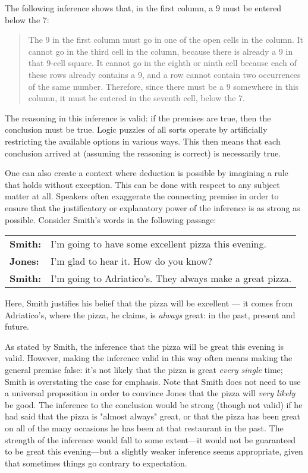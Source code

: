 The following inference shows that, in the first column, a 9 must be entered below the 7:

\begin{quotation} The 9 in the first column must go in one of the open cells in the column. It cannot go in the third cell in the column, because there is already a 9 in that 9-cell square. It cannot go in the eighth or ninth cell because each of these rows already contains a 9, and a row cannot contain two occurrences of the same number. Therefore, since there must be a 9 somewhere in this column, it must be entered in the seventh cell, below the 7.\end{quotation}

The reasoning in this inference is valid: if the premises are true, then the conclusion must be true. Logic puzzles of all sorts operate by artificially restricting the available options in various ways. This then means that each conclusion arrived at (assuming the reasoning is correct) is necessarily true.

One can also create a context where deduction is possible by imagining a rule that holds without exception. This can be done with respect to any subject matter at all. Speakers often exaggerate the connecting premise in order to ensure that the justificatory or explanatory power of the inference is as strong as possible. Consider Smith's words in the following passage:


\begin{adjustwidth}{2em}{0em}
\begin{longtabu}{p{.1\linewidth}p{.8\linewidth}}
\textbf{Smith:} & I'm going to have some excellent pizza this evening. \\
\textbf{Jones:} & I'm glad to hear it. How do you know?\\
\textbf{Smith:} & I'm going to Adriatico's. They always make a great pizza. \\
\end{longtabu}
\end{adjustwidth}
\vspace{-1cm}

Here, Smith justifies his belief that the pizza will be excellent --- it comes from Adriatico's, where the pizza, he claims, is \textit{always }great: in the past, present and future.

As stated by Smith, the inference that the pizza will be great this evening is valid. However, making the inference valid in this way often means making the general premise false: it's not likely that the pizza is great \textit{every single }time; Smith is overstating the case for emphasis. Note that Smith does not need to use a universal proposition in order to convince Jones that the pizza will \textit{very likely} be good. The inference to the conclusion would be strong (though not valid) if he had said that the pizza is "almost always" great, or that the pizza has been great on all of the many occasions he has been at that restaurant in the past. The strength of the inference would fall to some extent---it would not be guaranteed to be great this evening---but a slightly weaker inference seems appropriate, given that sometimes things go contrary to expectation.

